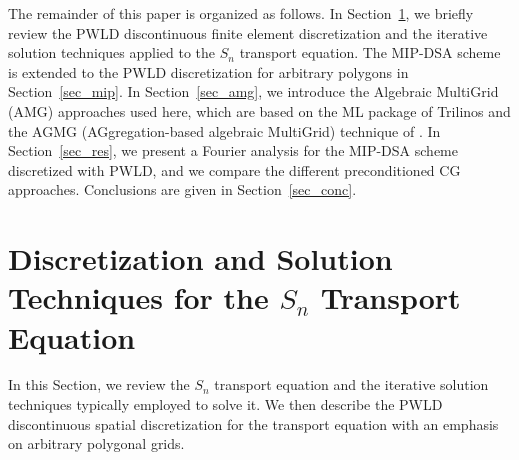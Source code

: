 \documentclass[preprint,10pt]{elsarticle}
\renewcommand{\(}{\left(}
\renewcommand{\)}{\right)}
\renewcommand{\[}{\left[}
\renewcommand{\]}{\right]}
\newcommand{\sn}{\ensuremath{S_n}\xspace}
\begin{document}
The remainder of this paper is organized as follows. In Section~\ref {sec_transport},
we briefly review the PWLD discontinuous finite element discretization 
and the iterative solution techniques applied to the 
\sn transport equation. 
The MIP-DSA scheme is extended to the PWLD discretization for arbitrary 
polygons in Section~\ref {sec_mip}. In Section~\ref {sec_amg}, we introduce the Algebraic MultiGrid (AMG) 
approaches used here, which are based on the ML package of Trilinos \cite{ml_guide} and the
AGMG (AGgregation-based algebraic MultiGrid) technique of 
\cite{agmg_guide,agmg,agmg2,agmg3}. In
Section~\ref {sec_res}, we present a Fourier analysis for the MIP-DSA scheme discretized with
PWLD, and we compare the different preconditioned CG approaches.
Conclusions are given in Section~\ref {sec_conc}.

\section{Discretization and Solution Techniques for the $S_n$ Transport Equation}\label{sec_transport}

In this Section, we review the \sn transport equation 
and the iterative solution techniques typically
employed to solve it. 
We then describe the PWLD discontinuous spatial
discretization for the transport equation with an emphasis on arbitrary
polygonal grids.

\end{document}
